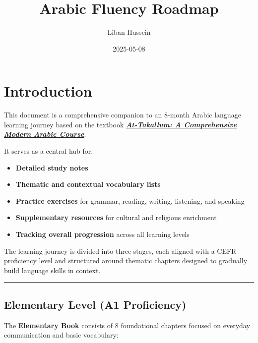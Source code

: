 \documentclass[
  a4paper,
  DIV=11,
  numbers=noendperiod]{scrartcl}
\title{Arabic Fluency Roadmap}
\author{Liban Hussein}
\date{2025-05-08}
\providecommand{\tightlist}{%
  \setlength{\itemsep}{0pt}\setlength{\parskip}{0pt}}
\renewcommand*\contentsname{Table of contents}
\newcommand\contentsname{Table of contents}
\begin{document}
\maketitle

\renewcommand*\contentsname{Table of contents}
{
\hypersetup{linkcolor=}
\setcounter{tocdepth}{3}
\tableofcontents
}

\section{Introduction}\label{sec-intro}

This document is a comprehensive companion to an 8-month Arabic language
learning journey based on the textbook
\href{https://attakallum.com/attakallum-online/login}{\textbf{\emph{At-Takallum:
A Comprehensive Modern Arabic Course}}}.

It serves as a central hub for:

\begin{itemize}
\tightlist
\item
  \textbf{Detailed study notes}\\
\item
  \textbf{Thematic and contextual vocabulary lists}\\
\item
  \textbf{Practice exercises} for grammar, reading, writing, listening,
  and speaking\\
\item
  \textbf{Supplementary resources} for cultural and religious
  enrichment\\
\item
  \textbf{Tracking overall progression} across all learning levels
\end{itemize}

The learning journey is divided into three stages, each aligned with a
CEFR proficiency level and structured around thematic chapters designed
to gradually build language skills in context.

\begin{center}\rule{0.5\linewidth}{0.5pt}\end{center}

\subsection{Elementary Level (A1
Proficiency)}\label{elementary-level-a1-proficiency}

The \textbf{Elementary Book} consists of 8 foundational chapters focused
on everyday communication and basic vocabulary:
\end{document}
